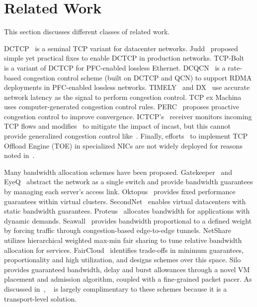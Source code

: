 \section{Related Work}
\label{related}
This section discusses different classes of related work.

DCTCP~\cite{alizadeh2011data} is a seminal TCP variant for datacenter networks.
Judd~\cite{judd2015nsdi} proposed simple yet practical fixes to enable DCTCP in production networks.
TCP-Bolt~\cite{stephens2014practical} is a variant of DCTCP for PFC-enabled lossless Ethernet.
DCQCN~\cite{zhu2015congestion} is a rate-based congestion control scheme (built on DCTCP and QCN) to
support RDMA deployments in PFC-enabled lossless networks.
TIMELY~\cite{mittal2015timely} and DX~\cite{lee2015accurate} 
use accurate network latency as the signal to perform congestion control.
TCP ex Machina~\cite{winstein2013tcp} uses computer-generated congestion control rules.
PERC~\cite{jose2015high} proposes proactive congestion control to improve convergence.
ICTCP's~\cite{wu2010ictcp} receiver monitors incoming TCP flows and 
modifies~\rwnd{} to mitigate the impact of incast, but this cannot
provide generalized congestion control like~\acdc{}.
Finally, efforts~\cite{dell-toe,chelsio-toe} to 
implement TCP Offload Engine (TOE) in specialized NICs are not widely deployed for reasons noted in~\cite{mogul2003tcp,linux-toe}.

 Many bandwidth allocation schemes have been proposed.
Gatekeeper~\cite{rodrigues2011gatekeeper} and EyeQ~\cite{jeyakumar2013eyeq} abstract the network as a single
switch and provide bandwidth guarantees by managing each server's access link.
Oktopus~\cite{Ballani2011oktopus} provides fixed performance guarantees within virtual clusters.
SecondNet~\cite{Guo2010Secondnet} enables virtual datacenters with static bandwidth guarantees.
Proteus~\cite{Xie2012Proteus} allocates bandwidth for applications with dynamic demands.
Seawall~\cite{shieh2011sharing} provides bandwidth proportional to a defined weight by
forcing traffic through congestion-based edge-to-edge tunnels. 
NetShare~\cite{Lam2012NetShare} utilizes hierarchical weighted max-min fair sharing to tune relative bandwidth allocation for services.
FairCloud~\cite{Popa2012Faircloud} identifies trade-offs in minimum
guarantees, proportionality and high utilization, and designs schemes over this space.
Silo~\cite{jang2015silo} provides guaranteed bandwidth, delay and burst allowances through a novel VM placement and admission 
algorithm, coupled with a fine-grained packet pacer. As discussed in~, 
~\acdc{} is largely complimentary to these schemes because it is a transport-level solution.

